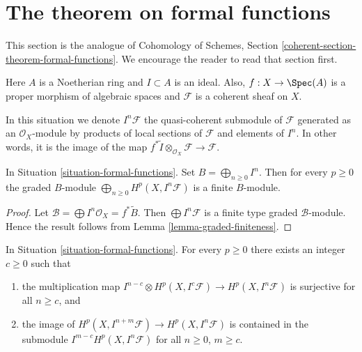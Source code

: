 \section{The theorem on formal functions}
\label{section-theorem-formal-functions}

\noindent
This section is the analogue of
Cohomology of Schemes, Section \ref{coherent-section-theorem-formal-functions}.
We encourage the reader to read that section first.

\begin{situation}
\label{situation-formal-functions}
Here $A$ is a Noetherian ring and $I \subset A$ is an ideal.
Also, $f : X \to \Spec(A)$ is a proper morphism of algebraic spaces
and $\mathcal{F}$ is a coherent sheaf on $X$.
\end{situation}

\noindent
In this situation we denote $I^n\mathcal{F}$ the quasi-coherent
submodule of $\mathcal{F}$ generated as an $\mathcal{O}_X$-module
by products of local sections of $\mathcal{F}$ and elements of $I^n$.
In other words, it is the image of the map
$f^*\widetilde{I} \otimes_{\mathcal{O}_X} \mathcal{F} \to \mathcal{F}$.

\begin{lemma}
\label{lemma-cohomology-powers-ideal-times-F}
In Situation \ref{situation-formal-functions}.
Set $B = \bigoplus_{n \geq 0} I^n$.
Then for every $p \geq 0$ the graded $B$-module
$\bigoplus_{n \geq 0} H^p(X, I^n\mathcal{F})$ is
a finite $B$-module.
\end{lemma}

\begin{proof}
Let $\mathcal{B} = \bigoplus I^n\mathcal{O}_X = f^*\widetilde{B}$.
Then $\bigoplus I^n\mathcal{F}$ is a finite type
graded $\mathcal{B}$-module. Hence the result follows
from Lemma \ref{lemma-graded-finiteness}.
\end{proof}

\begin{lemma}
\label{lemma-cohomology-powers-ideal-application}
In Situation \ref{situation-formal-functions}.
For every $p \geq 0$ there exists an integer $c \geq 0$ such that
\begin{enumerate}
\item the multiplication map
$I^{n - c} \otimes H^p(X, I^c\mathcal{F}) \to H^p(X, I^n\mathcal{F})$
is surjective for all $n \geq c$, and
\item the image of $H^p(X, I^{n + m}\mathcal{F}) \to H^p(X, I^n\mathcal{F})$
is contained in the submodule $I^{m - c} H^p(X, I^n\mathcal{F})$
for all $n \geq 0$, $m \geq c$.
\end{enumerate}
\end{lemma}

